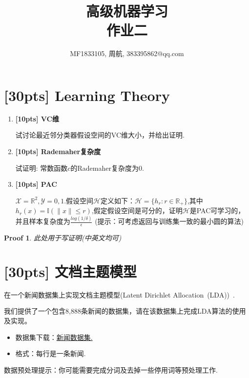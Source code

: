 \documentclass[a4paper,UTF8]{article}
\numberwithin{equation}{section}
\newtheorem*{myProof}{Proof}
\begin{document}
\title{高级机器学习\\
作业二}
\author{MF1833105, 周航, 383395862@qq.com}
\maketitle

\section{[30pts] Learning Theory}
\begin{enumerate}[(1)]
	\item \textbf{[10pts] VC维} 

	试讨论最近邻分类器假设空间的VC维大小，并给出证明.
	\item \textbf{[10pts] Rademaher复杂度}
	
	试证明: 常数函数$c$的Rademaher复杂度为$0$.
	\item \textbf{[10pts] PAC} 
	
	$\mathcal{X}=\mathbb{R}^2, \mathcal{Y}= {0,1}.$假设空间$\mathcal{H}$定义如下：$\mathcal{H}=\{h_r:r \in \mathbb{R}_+\}$,其中$h_r (x)=\mathbb{I}(\parallel x \parallel \leq r)$,假定假设空间是可分的，证明$\mathcal{H}$是PAC可学习的，并且样本复杂度为$\frac{log(1/\delta)}{\epsilon}$
	\newline
	(提示：可考虑返回与训练集一致的最小圆的算法)
\end{enumerate}
\begin{myProof}
此处用于写证明(中英文均可)


\end{myProof}
\newpage

\section{[30pts] 文档主题模型}
在一个新闻数据集上实现文档主题模型(Latent Dirichlet Allocation~(LDA))~\cite{DBLP:journals/jmlr/BleiNJ03}.

我们提供了一个包含8,888条新闻的数据集，请在该数据集上完成LDA算法的使用及实现。

\begin{itemize}
	\item 数据集下载：\href{http://lamda.nju.edu.cn/ml2018grad/dataset/news.txt.zip}{新闻数据集.}
	\item 格式：每行是一条新闻.
\end{itemize}

数据预处理提示：你可能需要完成分词及去掉一些停用词等预处理工作.
\end{document}
